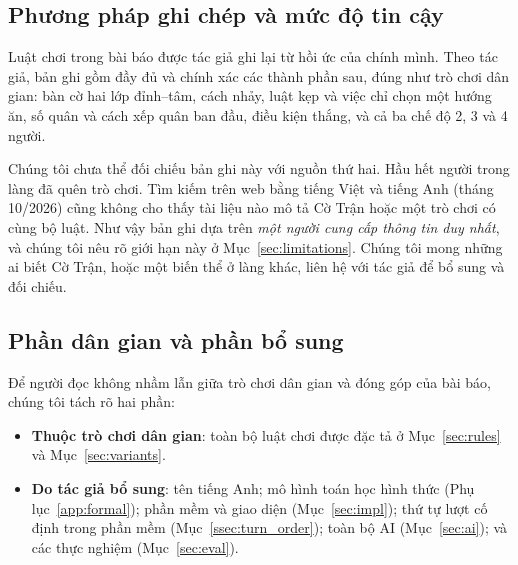 \subsection{Phương pháp ghi chép và mức độ tin cậy}

Luật chơi trong bài báo được tác giả ghi lại từ hồi ức của chính mình.
Theo tác giả, bản ghi gồm đầy đủ và chính xác các thành phần sau, đúng như
trò chơi dân gian: bàn cờ hai lớp đỉnh--tâm, cách nhảy, luật kẹp và việc
chỉ chọn một hướng ăn, số quân và cách xếp quân ban đầu, điều kiện thắng,
và cả ba chế độ 2, 3 và 4 người.

Chúng tôi chưa thể đối chiếu bản ghi này với nguồn thứ hai. Hầu hết người
trong làng đã quên trò chơi. Tìm kiếm trên web bằng tiếng Việt và tiếng Anh
(tháng 10/2026) cũng không cho thấy tài liệu nào mô tả Cờ Trận hoặc một trò
chơi có cùng bộ luật. Như vậy bản ghi dựa trên \emph{một người cung cấp
thông tin duy nhất}, và chúng tôi nêu rõ giới hạn này ở
Mục~\ref{sec:limitations}. Chúng tôi mong những ai biết Cờ Trận, hoặc một
biến thể ở làng khác, liên hệ với tác giả để bổ sung và đối chiếu.

\subsection{Phần dân gian và phần bổ sung}

Để người đọc không nhầm lẫn giữa trò chơi dân gian và đóng góp của bài báo,
chúng tôi tách rõ hai phần:
\begin{itemize}
  \item \textbf{Thuộc trò chơi dân gian}: toàn bộ luật chơi được đặc tả ở
        Mục~\ref{sec:rules} và Mục~\ref{sec:variants}.
  \item \textbf{Do tác giả bổ sung}: tên tiếng Anh; mô hình toán học hình
        thức (Phụ lục~\ref{app:formal}); phần mềm và giao diện
        (Mục~\ref{sec:impl}); thứ tự lượt cố định trong phần mềm
        (Mục~\ref{ssec:turn_order}); toàn bộ AI (Mục~\ref{sec:ai});
        và các thực nghiệm (Mục~\ref{sec:eval}).
\end{itemize}
